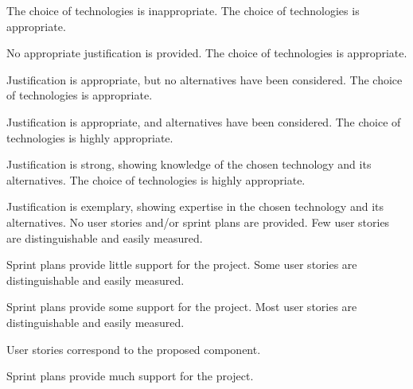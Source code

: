 \documentclass{../fal_assignment}
\begin{document}
\begin{markingrubric}
%
        \grade\fail The choice of technologies is inappropriate.
        \grade The choice of technologies is appropriate.
            \par No appropriate justification is provided.
        \grade The choice of technologies is appropriate.
            \par Justification is appropriate, but no alternatives have been considered.
        \grade The choice of technologies is appropriate.
            \par Justification is appropriate, and alternatives have been considered.
        \grade The choice of technologies is highly appropriate.
            \par Justification is strong, showing knowledge of the chosen technology and its alternatives.
        \grade The choice of technologies is highly appropriate.
            \par Justification is exemplary, showing expertise in the chosen technology and its alternatives.
%
        \grade\fail No user stories and/or sprint plans are provided.
        \grade Few user stories are distinguishable and easily measured.
            \par Sprint plans provide little support for the project.
        \grade Some user stories are distinguishable and easily measured.
            \par Sprint plans provide some support for the project.
        \grade Most user stories are distinguishable and easily measured.
            \par User stories correspond to the proposed component.
            \par Sprint plans provide much support for the project.

\end{markingrubric}
\end{document}
